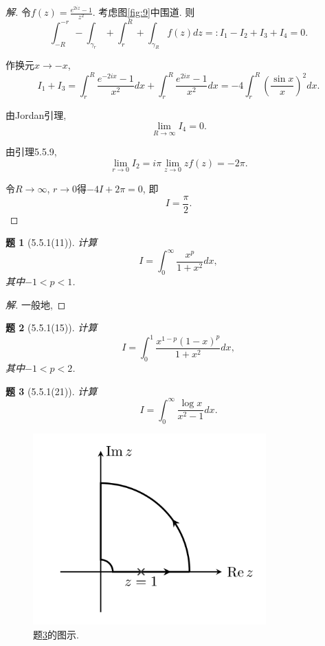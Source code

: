 \documentclass{article}[a4paper, 12pt]
\theoremstyle{mystyle}
\newtheorem{problem}{题}
\newenvironment{solution}{\begin{proof}[解]}{\end{proof}}
\begin{document}
\begin{solution}
  令\(f(z)=\frac{e^{2iz}-1}{z^2}\). 考虑图\ref{fig:9}中围道. 则\[\int_{-R}^{-r}-\int_{\gamma_r}+\int_{r}^R+\int_{\gamma_R} f(z)dz=:I_1-I_2+I_3+I_4=0.\]

  作换元\(x\to -x\), \[I_1+I_3=\int_r^R \frac{e^{-2ix}-1}{x^2}dx+\int_r^R \frac{e^{2ix}-1}{x^2}dx=-4\int_r^R \left(\frac{\sin x}{x}\right)^2dx.\]

  由Jordan引理, \[\lim_{R\to\infty} I_4=0.\]

  由引理5.5.9, \[\lim_{r\to0}I_2=i\pi\lim_{z\to0}zf(z)=-2\pi.\]

  令\(R\to\infty\), \(r\to0\)得\(-4I+2\pi=0\), 即\[I=\frac{\pi}{2}.\tag*{\(\qed\)}\]
  \renewcommand{\qedsymbol}{}
\end{solution}

\begin{problem}[5.5.1(11)]
  计算\[I=\int_0^\infty \frac{x^p}{1+x^2}dx,\] 其中\(-1<p<1\).
\end{problem}

\begin{solution}
  一般地, 
\end{solution}

\begin{problem}[5.5.1(15)]
  计算\[I=\int_0^1 \frac{x^{1-p}(1-x)^p}{1+x^2}dx,\] 其中\(-1<p<2\).
\end{problem}

\begin{problem}[5.5.1(21)]\label{21}
  计算\[I=\int_0^\infty \frac{\log x}{x^2-1}dx.\]
\end{problem}

\begin{figure}[htbp]
  \centering
  \includegraphics[width=0.8\textwidth]{images/21.png}
  \caption{题\ref{21}的图示.}
  \label{fig:21}
\end{figure}
\end{document}
